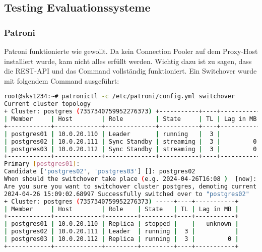 
\clearpage
\begin{flushleft}
    \subsection{Testing Evaluationssysteme}
    \subsubsection{Patroni}
    Patroni funktionierte wie gewollt.
    Da kein \Gls{Connection Pooler} auf dem Proxy-Host installiert wurde, kam nicht alles erfüllt werden.
    Wichtig dazu ist zu sagen, dass die REST-API und das Command vollständig funktioniert.
    Ein Switchover wurde mit folgendem Command ausgeführt:
\lstset{style=gra_codestyle}
\begin{lstlisting}[language=bash, caption=Patroni - Testing - Switchover,captionpos=b,label={lst:testing_patroni_switchover},breaklines=true]
root@sks1234:~# patronictl -c /etc/patroni/config.yml switchover
Current cluster topology
+ Cluster: postgres (7357340759952276373) +-----------+----+-----------+
| Member     | Host        | Role         | State     | TL | Lag in MB |
+------------+-------------+--------------+-----------+----+-----------+
| postgres01 | 10.0.20.110 | Leader       | running   |  3 |           |
| postgres02 | 10.0.20.111 | Sync Standby | streaming |  3 |         0 |
| postgres03 | 10.0.20.112 | Sync Standby | streaming |  3 |         0 |
+------------+-------------+--------------+-----------+----+-----------+
Primary [postgres01]:
Candidate ['postgres02', 'postgres03'] []: postgres02
When should the switchover take place (e.g. 2024-04-26T16:08 )  [now]: now
Are you sure you want to switchover cluster postgres, demoting current leader postgres01? [y/N]: y
2024-04-26 15:09:02.68997 Successfully switched over to "postgres02"
+ Cluster: postgres (7357340759952276373) -----+----+-----------+
| Member     | Host        | Role    | State   | TL | Lag in MB |
+------------+-------------+---------+---------+----+-----------+
| postgres01 | 10.0.20.110 | Replica | stopped |    |   unknown |
| postgres02 | 10.0.20.111 | Leader  | running |  3 |           |
| postgres03 | 10.0.20.112 | Replica | running |  3 |         0 |
+------------+-------------+---------+---------+----+-----------+

\end{lstlisting}
\end{flushleft}

